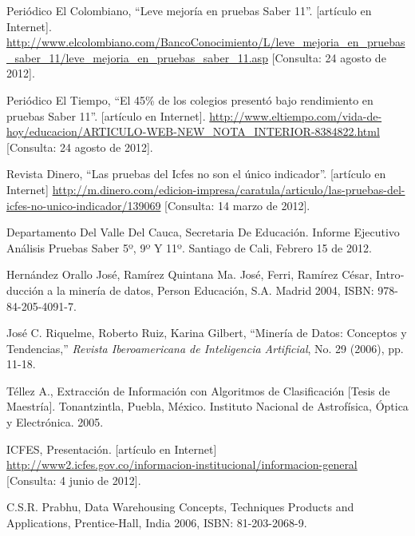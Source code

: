 \begin{thebibliography}{Referencias}
\foreignlanguage{english}{Periódico
El Colombiano, \textquotedblleft{}Leve mejoría en pruebas Saber 11\textquotedblright{}.
{[}artículo en Internet{]}}. \url{http://www.elcolombiano.com/BancoConocimiento/L/leve_mejoria_en_pruebas_saber_11/leve_mejoria_en_pruebas_saber_11.asp}\foreignlanguage{english}{
{[}Consulta: 24 agosto de 2012{]}.}

Periódico El Tiempo, \textquotedblleft{}El 45\% de
los colegios presentó bajo rendimiento en pruebas Saber 11\textquotedblright{}.
{[}artículo en Internet{]}\foreignlanguage{spanish}{. }\url{http://www.eltiempo.com/vida-de-hoy/educacion/ARTICULO-WEB-NEW\_NOTA\_INTERIOR-8384822.html}\foreignlanguage{spanish}{
}{[}Consulta: 24 agosto de 2012{]}.

Revista Dinero, \textquotedblleft{}Las pruebas del
Icfes no son el único indicador\textquotedblright{}. {[}artículo en
Internet{]}   \url{http://m.dinero.com/edicion-impresa/caratula/articulo/las-pruebas-del-icfes-no-unico-indicador/139069}
{[}Consulta: 14 marzo de 2012{]}.

Departamento Del Valle Del Cauca, Secretaria De Educación.
Informe Ejecutivo Análisis Pruebas Saber 5º, 9º Y 11º. Santiago de
Cali, Febrero 15 de 2012.

\foreignlanguage{spanish}{Hernández Orallo José,
Ramírez Quintana Ma. José, Ferri, Ramírez César, Introducción a la
minería de datos, Person Educación, S.A. Madrid 2004, ISBN: 978-84-205-4091-7.}

%
José C. Riquelme, Roberto Ruiz, Karina Gilbert, \textquotedblleft{}Minería
de Datos: Conceptos y Tendencias,\textquotedblright{} \emph{Revista
Iberoamericana de Inteligencia Artificial}, No. 29 (2006), pp. 11-18.

Téllez A., Extracción de Información con Algoritmos
de Clasificación {[}Tesis de Maestría{]}. Tonantzintla, Puebla, México.
Instituto Nacional de Astrofísica, Óptica y Electrónica. 2005.

ICFES, Presentación. {[}artículo en Internet{]} \url{http://www2.icfes.gov.co/informacion-institucional/informacion-general}
{[}Consulta: 4 junio de 2012{]}.

C.S.R. Prabhu, Data Warehousing Concepts, Techniques
Products and Applications, Prentice-Hall, India 2006, ISBN: 81-203-2068-9.


\end{thebibliography}
